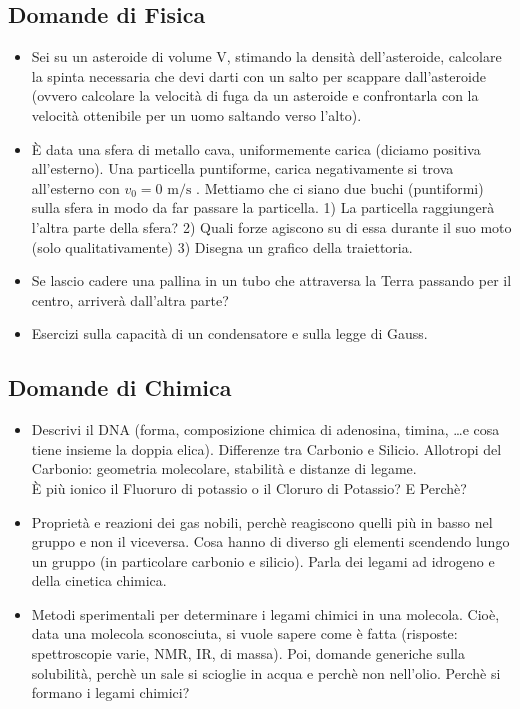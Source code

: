 \documentclass[a4paper,11pt]{article}
\begin{document}
\subsection*{Domande di Fisica}
\begin{itemize}
\item Sei su un asteroide di volume V, stimando la densità dell'asteroide, calcolare la spinta necessaria che devi darti con un salto per scappare dall'asteroide (ovvero calcolare la velocit\`a di fuga da un asteroide e confrontarla con la velocit\`a ottenibile per un uomo saltando verso l'alto).
\item \`E data una sfera di metallo cava, uniformemente carica (diciamo positiva all'esterno). Una particella puntiforme, carica negativamente si trova all'esterno con $v_0 = 0 \mbox{ m/s }$. Mettiamo che ci siano due buchi (puntiformi) sulla sfera in modo da far passare la particella. 1) La particella raggiunger\`a l'altra parte della sfera? 2) Quali forze agiscono su di essa durante il suo moto (solo qualitativamente) 3) Disegna un grafico della traiettoria.
\item Se lascio cadere una pallina in un tubo che attraversa la Terra passando per il centro, arriver\`a dall'altra parte?
\item Esercizi sulla capacit\`a di un condensatore e sulla legge di Gauss.
\end{itemize}
\subsection*{Domande di Chimica}
\begin{itemize}
\item Descrivi il DNA (forma, composizione chimica di adenosina, timina, \ldots e cosa tiene insieme la doppia elica). Differenze tra Carbonio e Silicio. Allotropi del Carbonio: geometria molecolare, stabilit\`a e distanze di legame. \\ \`E pi\`u ionico il Fluoruro di potassio o il Cloruro di Potassio? E Perch\`e?
\item Propriet\`a e reazioni dei gas nobili, perch\`e reagiscono quelli pi\`u in basso nel gruppo e non il viceversa. Cosa hanno di diverso gli elementi scendendo lungo un gruppo (in particolare carbonio e silicio). Parla dei legami ad idrogeno e della cinetica chimica.
\item Metodi sperimentali per determinare i legami chimici in una molecola. Cio\`e, data una molecola sconosciuta, si vuole sapere come \`e fatta (risposte: spettroscopie varie, NMR, IR, di massa). Poi, domande generiche sulla solubilit\`a, perch\`e un sale si scioglie in acqua e perch\`e non nell'olio. Perch\`e si formano i legami chimici?
\end{itemize}
\end{document}
